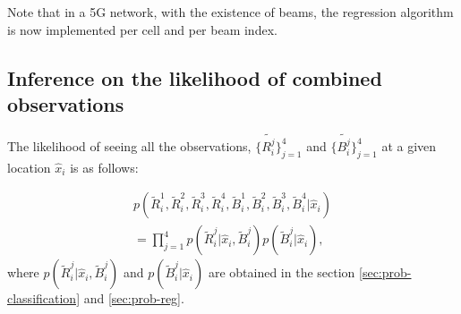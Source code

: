 \documentclass[conference, 10pt]{IEEEtran}
\begin{document}
\begin{NoHyper}
Note that in a 5G network, with the existence of beams, the regression algorithm is now implemented per cell and per beam index.

\subsection{Inference on the likelihood of combined observations}
\label{sec:prob-combined}
The likelihood of seeing all the observations, $\{\tilde{R^j_i}\}_{j=1}^4$ and $\{\tilde{B^j_i}\}_{j=1}^4$ at a given location $\hat{x}_{i}$ is as follows:

\begin{equation} 
\begin{split}
	p(\tilde{R}^1_i, \tilde{R}^2_i, \tilde{R}^3_i,\tilde{R}^4_i, \tilde{B}^1_i, \tilde{B}^2_i, \tilde{B}^3_i, \tilde{B}^4_i|\hat{x}_{i})
	\\
	=\prod_{j=1}^4 p(\tilde{R}^j_i|\hat{x}_{i}, \tilde{B}^j_i)p(\tilde{B}^j_i|\hat{x}_{i}),
\end{split}
\label{eqn:combined}
\end{equation}
where $p(\tilde{R}^j_i|\hat{x}_{i}, \tilde{B}^j_i)$ and $p(\tilde{B}^j_i|\hat{x}_{i})$ are obtained in the section \ref{sec:prob-classification} and \ref{sec:prob-reg}.




\end{NoHyper}
\end{document}
